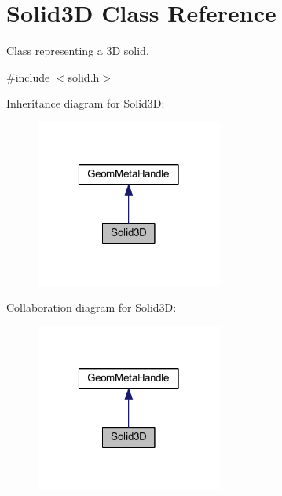 \hypertarget{class_solid3_d}{\section{Solid3\-D Class Reference}
\label{class_solid3_d}
}


Class representing a 3\-D solid.  




{\ttfamily \#include $<$solid.\-h$>$}



Inheritance diagram for Solid3\-D\-:
\nopagebreak
\begin{figure}[H]
\begin{center}
\leavevmode
\includegraphics[width=174pt]{class_solid3_d__inherit__graph}
\end{center}
\end{figure}


Collaboration diagram for Solid3\-D\-:
\nopagebreak
\begin{figure}[H]
\begin{center}
\leavevmode
\includegraphics[width=174pt]{class_solid3_d__coll__graph}
\end{center}
\end{figure}
